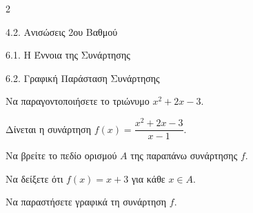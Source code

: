\begin{ylh}{2}
    \item 4.2. Ανισώσεις 2ου Βαθμού
    \item 6.1. Η Έννοια της Συνάρτησης
    \item 6.2. Γραφική Παράσταση Συνάρτησης
\end{ylh}

\begin{alist}
\item Να παραγοντοποιήσετε το τριώνυμο $x^2 + 2x - 3$.
\item Δίνεται η συνάρτηση $f(x) = \dfrac{x^2+2x-3}{x-1}$.
\begin{rlist}
\item Να βρείτε το πεδίο ορισμού $A$ της παραπάνω συνάρτησης $f$.

\item Να δείξετε ότι $f(x) = x+3$ για κάθε $x \in A$.
\item Να παραστήσετε γραφικά τη συνάρτηση $f$.
\end{rlist}
\end{alist}

